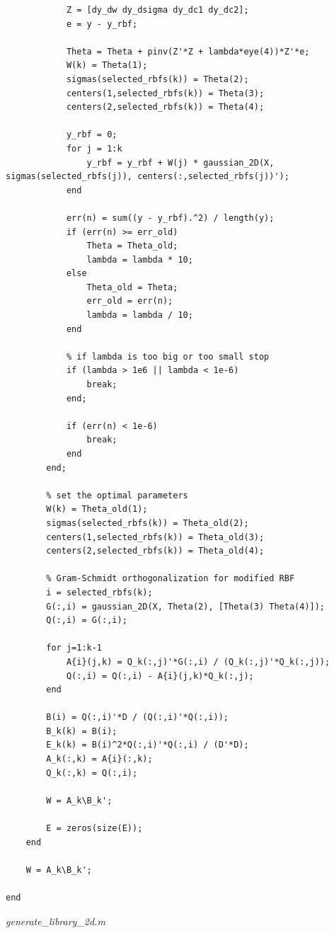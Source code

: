 \begin{lstlisting}
            Z = [dy_dw dy_dsigma dy_dc1 dy_dc2];
            e = y - y_rbf;

            Theta = Theta + pinv(Z'*Z + lambda*eye(4))*Z'*e;            
            W(k) = Theta(1);
            sigmas(selected_rbfs(k)) = Theta(2);
            centers(1,selected_rbfs(k)) = Theta(3);
            centers(2,selected_rbfs(k)) = Theta(4);
            
            y_rbf = 0;
            for j = 1:k
                y_rbf = y_rbf + W(j) * gaussian_2D(X, sigmas(selected_rbfs(j)), centers(:,selected_rbfs(j))');
            end

            err(n) = sum((y - y_rbf).^2) / length(y);
            if (err(n) >= err_old)
                Theta = Theta_old;
                lambda = lambda * 10;
            else
                Theta_old = Theta;
                err_old = err(n);
                lambda = lambda / 10;                
            end

            % if lambda is too big or too small stop
            if (lambda > 1e6 || lambda < 1e-6)
                break;
            end;
            
            if (err(n) < 1e-6)
                break;
            end
        end;
        
        % set the optimal parameters
        W(k) = Theta_old(1);
        sigmas(selected_rbfs(k)) = Theta_old(2);
        centers(1,selected_rbfs(k)) = Theta_old(3);
        centers(2,selected_rbfs(k)) = Theta_old(4);

        % Gram-Schmidt orthogonalization for modified RBF
        i = selected_rbfs(k);
        G(:,i) = gaussian_2D(X, Theta(2), [Theta(3) Theta(4)]);
        Q(:,i) = G(:,i);

        for j=1:k-1
            A{i}(j,k) = Q_k(:,j)'*G(:,i) / (Q_k(:,j)'*Q_k(:,j));
            Q(:,i) = Q(:,i) - A{i}(j,k)*Q_k(:,j);
        end

        B(i) = Q(:,i)'*D / (Q(:,i)'*Q(:,i));
        B_k(k) = B(i);
        E_k(k) = B(i)^2*Q(:,i)'*Q(:,i) / (D'*D);
        A_k(:,k) = A{i}(:,k);
        Q_k(:,k) = Q(:,i);

        W = A_k\B_k';

        E = zeros(size(E));
    end

    W = A_k\B_k';

end
\end{lstlisting}

\textit{generate\_library\_2d.m}


